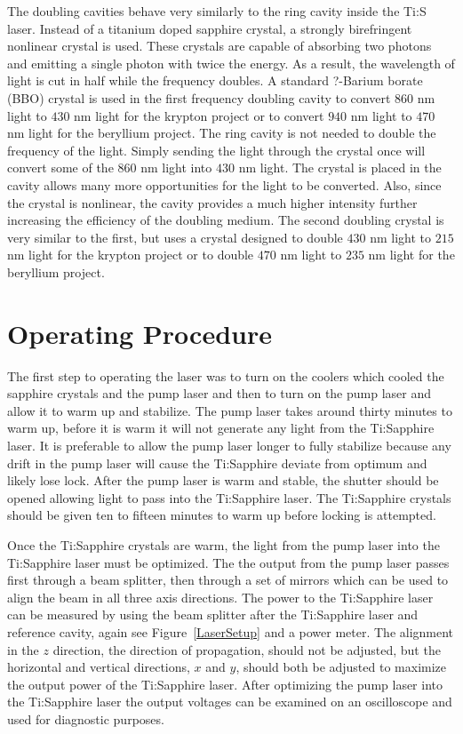 \documentclass[prb,preprint]{revtex4-1}
\begin{document}
The doubling cavities behave very similarly to the ring cavity inside the Ti:S laser.  Instead of a titanium doped sapphire crystal, a strongly birefringent nonlinear crystal is used.  These crystals are capable of absorbing two photons and emitting a single photon with twice the energy.  As a result, the wavelength of light is cut in half while the frequency doubles.  A standard ?-Barium borate (BBO) crystal is used in the first frequency doubling cavity to convert $860$ nm light to $430$ nm light for the krypton project or to convert $940$ nm light to $470$ nm light for the beryllium project.  The ring cavity is not needed to double the frequency of the light.  Simply sending the light through the crystal once will convert some of the $860$ nm light into $430$ nm light.  The crystal is placed in the cavity allows many more opportunities for the light to be converted.  Also, since the crystal is nonlinear, the cavity provides a much higher intensity further increasing the efficiency of the doubling medium.  The second doubling crystal is very similar to the first, but uses a crystal designed to double $430$ nm light to $215$ nm light for the krypton project or to double $470$ nm light to $235$ nm light for the beryllium project.

\section{Operating Procedure}
The first step to operating the laser was to turn on the coolers which cooled the sapphire crystals and the pump laser and then to turn on the pump laser and allow it to warm up and stabilize. The pump laser takes around thirty minutes to warm up, before it is warm it will not generate any light from the Ti:Sapphire laser. It is preferable to allow the pump laser longer to fully stabilize because any drift in the pump laser will cause the Ti:Sapphire deviate from optimum and likely lose lock. After the pump laser is warm and stable, the shutter should be opened allowing light to pass into the Ti:Sapphire laser. The Ti:Sapphire crystals should be given ten to fifteen minutes to warm up before locking is attempted.

Once the Ti:Sapphire crystals are warm, the light from the pump laser into the Ti:Sapphire laser must be optimized. The the output from the pump laser passes first through a beam splitter, then through a set of mirrors which can be used to align the beam in all three axis directions. The power to the Ti:Sapphire laser can be measured by using the beam splitter after the Ti:Sapphire laser and reference cavity, again see Figure~\ref{LaserSetup} and a power meter. The alignment in the $z$ direction, the direction of propagation, should not be adjusted, but the horizontal and vertical directions, $x$ and $y$, should both be adjusted to maximize the output power of the Ti:Sapphire laser. After optimizing the pump laser into the Ti:Sapphire laser the output voltages can be examined on an oscilloscope and used for diagnostic purposes. 
\end{document}
